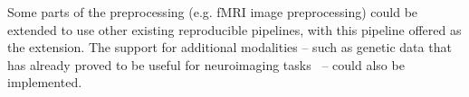 Some parts of the preprocessing (e.g. fMRI image preprocessing) could be extended to use other existing reproducible pipelines, with this pipeline offered as the extension. The support for additional modalities – such as genetic data that has already proved to be useful for neuroimaging tasks~\cite{cole2018brain,parisot2018disease} – could also be implemented.








